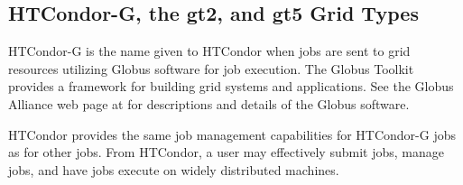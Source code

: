 
\subsection{\label{sec:HTCondor-G}HTCondor-G, the gt2, and gt5 Grid Types}

HTCondor-G is the name given to HTCondor when 
 jobs are sent to grid resources utilizing
Globus software for job execution.
The Globus Toolkit provides a framework for building grid systems
and applications.
See the Globus Alliance web page at
for descriptions and details of the Globus software.

HTCondor provides the same job management capabilities for HTCondor-G
jobs as for other jobs.
From HTCondor, a user may effectively submit jobs, manage jobs,
and have jobs execute on widely distributed machines.



